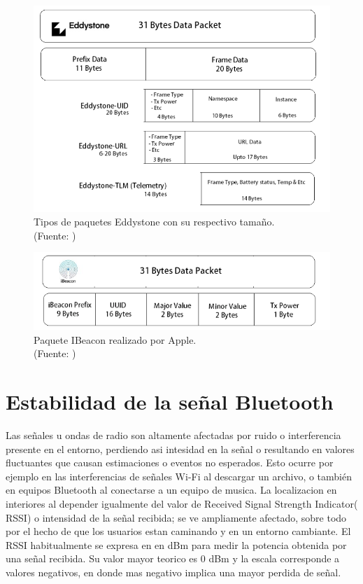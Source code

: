 \begin{figure}[ht!]
\centering
\includegraphics[width=.6\textwidth]{figures/eddystoneProtocol.png}
\caption[abs]{Tipos de paquetes Eddystone con su respectivo tamaño.\\
{\scriptsize (Fuente: \citep{protocolosBeacon})}}
\label{fig:eddystone}
\end{figure}

\begin{figure}[ht!]
\centering
\includegraphics[width=.6\textwidth]{figures/ibeaconProtocol.png}
\caption[abs]{Paquete IBeacon realizado por Apple.\\
{\scriptsize (Fuente: \citep{protocolosBeacon})}}
\label{fig:ibeacon}
\end{figure}

\section{Estabilidad de la señal Bluetooth}

Las señales u ondas de radio son altamente afectadas por ruido o interferencia presente en el entorno, perdiendo asi intesidad en la señal o resultando en valores fluctuantes que causan estimaciones o eventos no esperados. Esto ocurre por ejemplo en las interferencias de señales Wi-Fi al descargar un archivo, o también en equipos Bluetooth al conectarse a un equipo de musica. La localizacion en interiores al depender igualmente del valor de Received Signal Strength Indicator( RSSI) o intensidad de la señal recibida; se ve ampliamente afectado, sobre todo por el hecho de que los usuarios estan caminando y en un entorno cambiante. El RSSI habitualmente se expresa en en dBm para medir la potencia obtenida por una señal recibida. Su valor mayor teorico es 0 dBm y la escala corresponde a valores negativos, en donde mas negativo implica una mayor perdida de señal.


